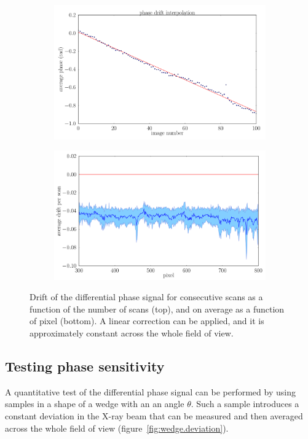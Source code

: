 \begin{figure}[htb]
    \centering
    \begin{subfigure}[b]{.75\textwidth}
        \includegraphics[width=\textwidth]{gfx/mythen-edge-on/drift_fit.png}
        \caption{}
    \end{subfigure}
    \begin{subfigure}[b]{.75\textwidth}
        \includegraphics[width=\textwidth]{gfx/mythen-edge-on/drift_pixels.png}
        \caption{}
    \end{subfigure}
    \caption{Drift of the differential phase signal for consecutive scans as
    a function of the number of scans (top), and on average as a function
of pixel (bottom). A linear correction can be applied, and it is
approximately constant across the whole field of view.}
    \label{fig:phase.drift}
\end{figure}

\subsection{Testing phase sensitivity}\label{sec:phase-sensitivity}
A quantitative test of the differential phase signal can be performed by
using samples in a shape of a wedge with an an angle $\theta$. Such a sample
introduces a constant deviation in the X-ray beam that can be measured and
then averaged across the whole field of view
(figure~\ref{fig:wedge.deviation}).

